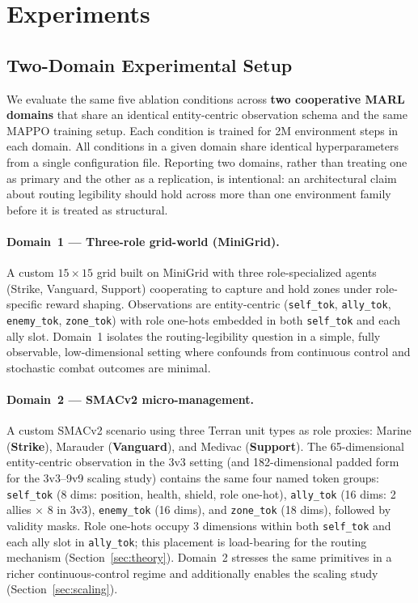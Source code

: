 \section{Experiments}
\label{sec:experiments}

\subsection{Two-Domain Experimental Setup}

We evaluate the same five ablation conditions across \textbf{two cooperative MARL domains} that share an identical entity-centric observation schema and the same MAPPO training setup. Each condition is trained for 2M environment steps in each domain. All conditions in a given domain share identical hyperparameters from a single configuration file. Reporting two domains, rather than treating one as primary and the other as a replication, is intentional: an architectural claim about routing legibility should hold across more than one environment family before it is treated as structural.

\paragraph{Domain~1 --- Three-role grid-world (MiniGrid).} A custom $15{\times}15$ grid built on MiniGrid with three role-specialized agents (Strike, Vanguard, Support) cooperating to capture and hold zones under role-specific reward shaping. Observations are entity-centric (\texttt{self\_tok}, \texttt{ally\_tok}, \texttt{enemy\_tok}, \texttt{zone\_tok}) with role one-hots embedded in both \texttt{self\_tok} and each ally slot. Domain~1 isolates the routing-legibility question in a simple, fully observable, low-dimensional setting where confounds from continuous control and stochastic combat outcomes are minimal.

\paragraph{Domain~2 --- SMACv2 micro-management.} A custom SMACv2 scenario using three Terran unit types as role proxies: Marine (\textbf{Strike}), Marauder (\textbf{Vanguard}), and Medivac (\textbf{Support}). The 65-dimensional entity-centric observation in the 3v3 setting (and 182-dimensional padded form for the 3v3--9v9 scaling study) contains the same four named token groups: \texttt{self\_tok} (8 dims: position, health, shield, role one-hot), \texttt{ally\_tok} (16 dims: 2 allies $\times$ 8 in 3v3), \texttt{enemy\_tok} (16 dims), and \texttt{zone\_tok} (18 dims), followed by validity masks. Role one-hots occupy 3 dimensions within both \texttt{self\_tok} and each ally slot in \texttt{ally\_tok}; this placement is load-bearing for the routing mechanism (Section~\ref{sec:theory}). Domain~2 stresses the same primitives in a richer continuous-control regime and additionally enables the scaling study (Section~\ref{sec:scaling}).

